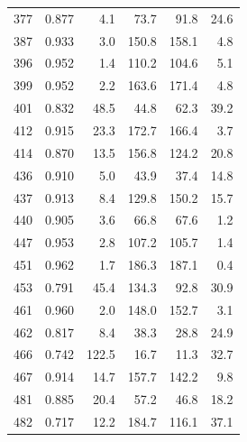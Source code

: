 \begin{table}[H]
\begin{minipage}{0.45\linewidth}
\begin{tabular}{rrrrrr}
377 & 0.877 & 4.1 & 73.7 & 91.8 & 24.6\\
387 & 0.933 & 3.0 & 150.8 & 158.1 & 4.8\\
396 & 0.952 & 1.4 & 110.2 & 104.6 & 5.1\\
399 & 0.952 & 2.2 & 163.6 & 171.4 & 4.8\\
401 & 0.832 & 48.5 & 44.8 & 62.3 & 39.2\\
412 & 0.915 & 23.3 & 172.7 & 166.4 & 3.7\\
414 & 0.870 & 13.5 & 156.8 & 124.2 & 20.8\\
436 & 0.910 & 5.0 & 43.9 & 37.4 & 14.8\\
437 & 0.913 & 8.4 & 129.8 & 150.2 & 15.7\\
440 & 0.905 & 3.6 & 66.8 & 67.6 & 1.2\\
447 & 0.953 & 2.8 & 107.2 & 105.7 & 1.4\\
451 & 0.962 & 1.7 & 186.3 & 187.1 & 0.4\\
453 & 0.791 & 45.4 & 134.3 & 92.8 & 30.9\\
461 & 0.960 & 2.0 & 148.0 & 152.7 & 3.1\\
462 & 0.817 & 8.4 & 38.3 & 28.8 & 24.9\\
466 & 0.742 & 122.5 & 16.7 & 11.3 & 32.7\\
467 & 0.914 & 14.7 & 157.7 & 142.2 & 9.8\\
481 & 0.885 & 20.4 & 57.2 & 46.8 & 18.2\\
482 & 0.717 & 12.2 & 184.7 & 116.1 & 37.1\\
\bottomrule
\end{tabular}
\end{minipage}
\end{table}
